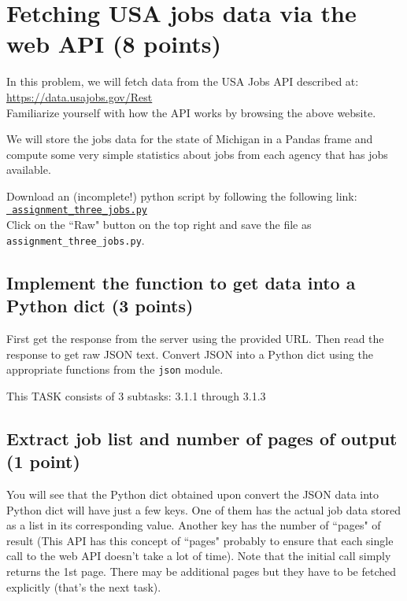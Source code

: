 \documentclass{article}
\begin{document}
\section{Fetching USA jobs data via the web API (8 points)}

In this problem, we will fetch data from the USA Jobs API described at:\\
\url{https://data.usajobs.gov/Rest} \\
Familiarize yourself with how the API works by browsing the above website.

We will store the jobs data for the state of Michigan in a Pandas frame and compute some very simple
statistics about jobs from each agency that has jobs available.

Download an (incomplete!) python script by following the following
link:\\
\href{https://github.com/ambujtewari/stats607a-fall2015/blob/master/homeworks/assignment_three_jobs.py}{\tt
assignment\_three\_jobs.py} \\
Click on the ``Raw" button on the top right and save the file as {\tt
assignment\_three\_jobs.py}.

\subsection{Implement the function to get data into a Python dict (3 points)}

First get the response from the server using the provided URL. Then
read the response to get raw JSON text. Convert JSON into a Python dict
using the appropriate functions from the {\tt json} module.

This TASK consists of 3 subtasks: 3.1.1 through 3.1.3

\subsection{Extract job list and number of pages of output (1 point)}

You will see that the Python dict obtained upon convert the JSON data
into Python dict will have just a few keys. One of them has the actual job data
stored as a list in its corresponding value. Another key has the number of ``pages"
of result (This API has this concept of ``pages" probably to ensure that
each single call to the web API doesn't take a lot of time). Note that the initial call simply returns the 1st page. There may be additional
pages but they have to be fetched explicitly (that's the next task).
\end{document}
